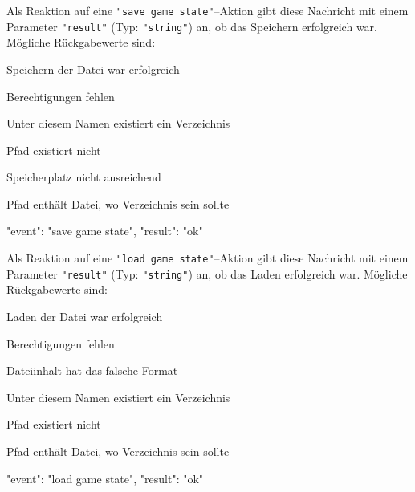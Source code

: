 \documentclass[a4paper, 12pt]{article}
\newenvironment{example}[1]{%
  \par\description[\setlabelstyle{\normalfont}\setlabelphantom{#1}]\item[#1]%
    \verbatim%
}{%
    \endverbatim%
  \enddescription%
}
\begin{document}
\begin{description}[\compact\breaklabel\setlabelstyle{\ttfamily}]
  \item[save game state]
    Als Reaktion auf eine \verb+"save game state"+--Aktion gibt diese Nachricht
    mit einem Parameter \verb+"result"+ (Typ: \verb+"string"+) an, ob das
    Speichern erfolgreich war.
    Mögliche Rückgabewerte sind:
    \begin{description}
      \item[ok]      Speichern der Datei war erfolgreich
      \item[eacces]  Berechtigungen fehlen
      \item[eisdir]  Unter diesem Namen existiert ein Verzeichnis
      \item[enoent]  Pfad existiert nicht
      \item[enospc]  Speicherplatz nicht ausreichend
      \item[enotdir] Pfad enthält Datei, wo Verzeichnis sein sollte
    \end{description}
    \begin{example}{Beispiel:}
{ "event": "save game state", "result": "ok" }
    \end{example}
    \vspace{-\baselineskip}

  \item[load game state]
    Als Reaktion auf eine \verb+"load game state"+--Aktion gibt diese Nachricht
    mit einem Parameter \verb+"result"+ (Typ: \verb+"string"+) an, ob das
    Laden erfolgreich war.
    Mögliche Rückgabewerte sind:
    \begin{description}
      \item[ok]      Laden der Datei war erfolgreich
      \item[eacces]  Berechtigungen fehlen
      \item[eformat] Dateiinhalt hat das falsche Format
      \item[eisdir]  Unter diesem Namen existiert ein Verzeichnis
      \item[enoent]  Pfad existiert nicht
      \item[enotdir] Pfad enthält Datei, wo Verzeichnis sein sollte
    \end{description}
    \begin{example}{Beispiel:}
{ "event": "load game state", "result": "ok" }
    \end{example}
    \vspace{-\baselineskip}


\end{description}
\end{document}
